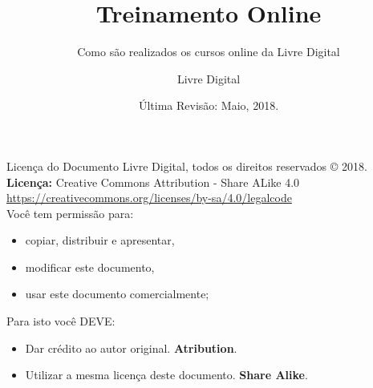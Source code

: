 \documentclass{beamer}
\title{Treinamento Online}
\subtitle{Como são realizados os cursos online da Livre Digital}
\author{Livre Digital}
\institute
{
  Nosso site: \url{http://www.livredigital.com}\\
  Socials: \href{https://www.twitter.com/LivreDigitalCom}{@LivreDigitalCom} | \href{https://www.github.com/livredigital}{Github} | \href{https://www.linkedin.com/company/livredigital}{LinkedIn}
}
\date{Última Revisão: Maio, 2018.}
\begin{document}
\begin{frame}
  \titlepage
\end{frame}

\begin{frame}{Licença do Documento}
  Livre Digital, todos os direitos reservados \copyright{} 2018.\\
  \textbf{Licença:} Creative Commons Attribution - Share ALike 4.0\\
  \small{\url{https://creativecommons.org/licenses/by-sa/4.0/legalcode}}\\[1cm]
  Você tem permissão para:
  \begin{itemize}
      \item copiar, distribuir e apresentar,
      \item modificar este documento,
      \item usar este documento comercialmente;
  \end{itemize}
  Para isto você DEVE:
  \begin{itemize}
      \item Dar crédito ao autor original. \textbf{Atribution}.
      \item Utilizar a mesma licença deste documento. \textbf{Share Alike}.
  \end{itemize}
\end{frame}
\end{document}
